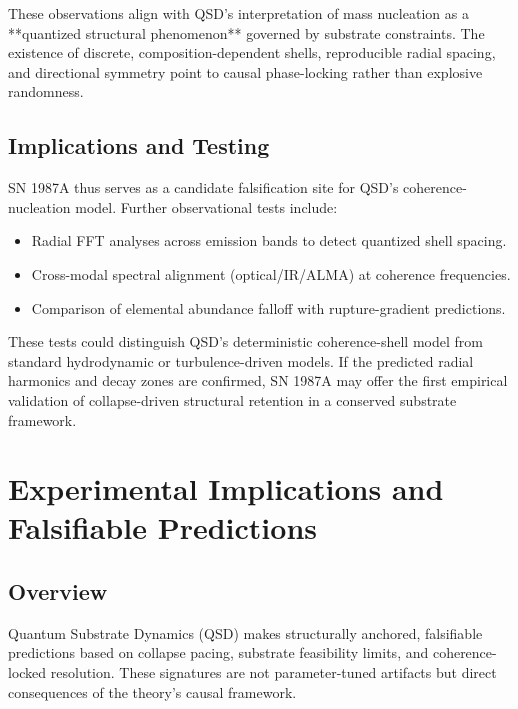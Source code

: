 \documentclass[preprints,article,submit,pdftex,moreauthors]{Definitions/mdpi}
\begin{document}
These observations align with QSD’s interpretation of mass nucleation as a **quantized structural phenomenon** governed by substrate constraints. The existence of discrete, composition-dependent shells, reproducible radial spacing, and directional symmetry point to causal phase-locking rather than explosive randomness.

\subsection[\appendixname~\thesubsection]{Implications and Testing}

SN 1987A thus serves as a candidate falsification site for QSD’s coherence-nucleation model. Further observational tests include:

\begin{itemize}
  \item Radial FFT analyses across emission bands to detect quantized shell spacing.
  \item Cross-modal spectral alignment (optical/IR/ALMA) at coherence frequencies.
  \item Comparison of elemental abundance falloff with rupture-gradient predictions.
\end{itemize}

These tests could distinguish QSD’s deterministic coherence-shell model from standard hydrodynamic or turbulence-driven models. If the predicted radial harmonics and decay zones are confirmed, SN 1987A may offer the first empirical validation of collapse-driven structural retention in a conserved substrate framework.

\section[\appendixname~\thesection]{Experimental Implications and Falsifiable Predictions}
\label{app:experimental}
\subsection[\appendixname~\thesubsection]{Overview}

Quantum Substrate Dynamics (QSD) makes structurally anchored, falsifiable predictions based on collapse pacing, substrate feasibility limits, and coherence-locked resolution. These signatures are not parameter-tuned artifacts but direct consequences of the theory’s causal framework.
\end{document}
